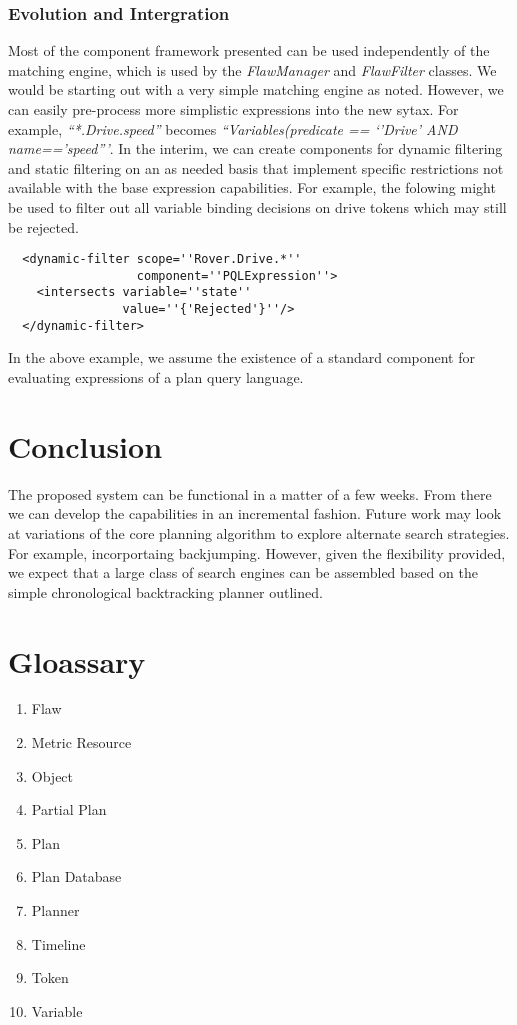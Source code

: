 \documentclass[10pt, letterpaper, oneside]{article}
\begin{document}
\subsubsection{Evolution and Intergration}
Most of the component framework presented can be used independently of the matching engine, which is used by the {\em FlawManager} and {\em FlawFilter} classes. We would be starting out with a very simple matching engine as noted. However, we can easily pre-process more simplistic expressions into the new sytax. For example, {\em ``*.Drive.speed''} becomes {\em ``Variables(predicate == `'Drive' AND name=='speed'''}. In the interim, we can create components for dynamic filtering and static filtering on an as needed basis that implement specific restrictions not available with the base expression capabilities. For example, the folowing might be used to filter out all variable binding decisions on drive tokens which may still be rejected.
\begin{verbatim}
  <dynamic-filter scope=''Rover.Drive.*'' 
                  component=''PQLExpression''>
    <intersects variable=''state'' 
                value=''{'Rejected'}''/>
  </dynamic-filter>
\end{verbatim}

In the above example, we assume the existence of a standard component for evaluating expressions of a plan query language.

\section{Conclusion}
The proposed system can be functional in a matter of a few weeks. From there we can develop the capabilities in an incremental fashion. Future work may look at variations of the core planning algorithm to explore alternate search strategies. For example, incorportaing backjumping. However, given the flexibility provided, we expect that a large class of search engines can be assembled based on the simple chronological backtracking planner outlined.
\section{Gloassary}
\begin{enumerate}
\item Flaw
\item Metric Resource
\item Object
\item Partial Plan
\item Plan
\item Plan Database
\item Planner
\item Timeline
\item Token
\item Variable
\end{enumerate}
\end{document}
